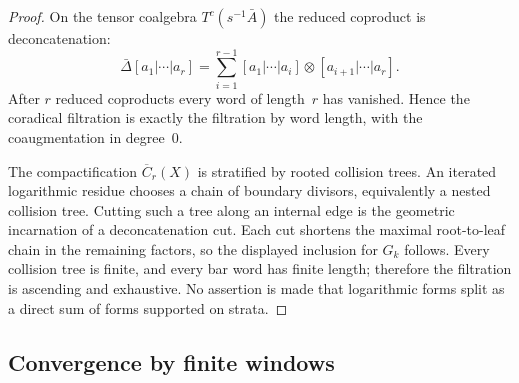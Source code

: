 \begin{proof}
On the tensor coalgebra $T^c(s^{-1}\bar A)$ the reduced coproduct is
deconcatenation:
\[
\bar\Delta[a_1|\cdots|a_r]
=
\sum_{i=1}^{r-1}
[a_1|\cdots|a_i]\otimes[a_{i+1}|\cdots|a_r].
\]
After $r$ reduced coproducts every word of length~$r$ has vanished.
Hence the coradical filtration is exactly the filtration by word
length, with the coaugmentation in degree~$0$.

The compactification $\overline C_r(X)$ is stratified by rooted
collision trees.  An iterated logarithmic residue chooses a chain of
boundary divisors, equivalently a nested collision tree.  Cutting such
a tree along an internal edge is the geometric incarnation of a
deconcatenation cut.  Each cut shortens the maximal root-to-leaf chain
in the remaining factors, so the displayed inclusion for $G_k$ follows.
Every collision tree is finite, and every bar word has finite length;
therefore the filtration is ascending and exhaustive.  No assertion is
made that logarithmic forms split as a direct sum of forms supported on
strata.
\end{proof}

\subsection{Convergence by finite windows}

